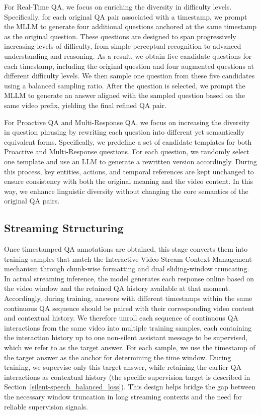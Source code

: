 For Real-Time QA, we focus on enriching the diversity in difficulty levels. Specifically, for each original QA pair associated with a timestamp, we prompt the MLLM to generate four additional questions anchored at the same timestamp as the original question. These questions are designed to span progressively increasing levels of difficulty, from simple perceptual recognition to advanced understanding and reasoning. As a result, we obtain five candidate questions for each timestamp, including the original question and four augmented questions at different difficulty levels.
We then sample one question from these five candidates using a balanced sampling ratio. After the question is selected, we prompt the MLLM to generate an answer aligned with the sampled question based on the same video prefix, yielding the final refined QA pair.



For Proactive QA and Multi-Response QA, we focus on increasing the diversity in question phrasing by rewriting each question into different yet semantically equivalent forms. Specifically, we predefine a set of candidate templates for both Proactive and Multi-Response questions. For each question, we randomly select one template and use an LLM to generate a rewritten version accordingly. During this process, key entities, actions, and temporal references are kept unchanged to ensure consistency with both the original meaning and the video content. In this way, we enhance linguistic diversity without changing the core semantics of the original QA pairs.


\subsection{Streaming Structuring}
\label{sec:strm_struc}

Once timestamped QA annotations are obtained, this stage converts them into training samples that match the Interactive Video Stream Context Management mechanism through chunk-wise formatting and dual sliding-window truncating. In actual streaming inference, the model generates each response online based on the video window and the retained QA history available at that moment. Accordingly, during training, answers with different timestamps within the same continuous QA sequence should be paired with their corresponding video content and contextual history. We therefore unroll each sequence of continuous QA interactions from the same video into multiple training samples, each containing the interaction history up to one non-silent assistant message to be supervised, which we refer to as the target answer. For each sample, we use the timestamp of the target answer as the anchor for determining the time window. During training, we supervise only this target answer, while retaining the earlier QA interactions as contextual history (the specific supervision target is described in Section~\ref{silent-speech_balanced_loss}). This design helps bridge the gap between the necessary window truncation in long streaming contexts and the need for reliable supervision signals.


